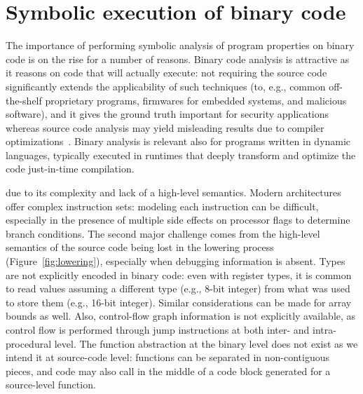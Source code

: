 
\section{Symbolic execution of binary code}
\label{se:symbolic-binary}

The importance of performing symbolic analysis of program properties on binary code is on the rise for a number of reasons. Binary code analysis is attractive as it reasons on code that will actually execute: not requiring the source code significantly extends the applicability of such techniques (to, e.g., common off-the-shelf proprietary programs, firmwares for embedded systems, and malicious software), and it gives the ground truth important for security applications whereas source code analysis may yield misleading results due to compiler optimizations~\cite{BITBLAZE-ICISS08}. %
Binary analysis is relevant also for programs written in dynamic languages, typically executed in runtimes that deeply transform and optimize the code  just-in-time compilation.



 due to its complexity and lack of a high-level semantics. Modern architectures offer complex instruction sets: modeling each instruction can be difficult, especially in the presence of multiple side effects on processor flags to determine branch conditions. The second major challenge comes from the high-level semantics of the source code being lost in the lowering process (Figure~\ref{fig:lowering}), especially when debugging information is absent. Types are not explicitly encoded in binary code: even with register types, it is common to read values assuming a different type (e.g., 8-bit integer) from what was used to store them (e.g., 16-bit integer). Similar considerations can be made for array bounds as well. Also, control-flow graph information is not explicitly available, as control flow is performed through jump instructions at both inter- and intra-procedural level. The function abstraction at the binary level does not exist as we intend it at source-code level: functions can be separated in non-contiguous pieces, and code may also call in the middle of a code block generated for a source-level function.

